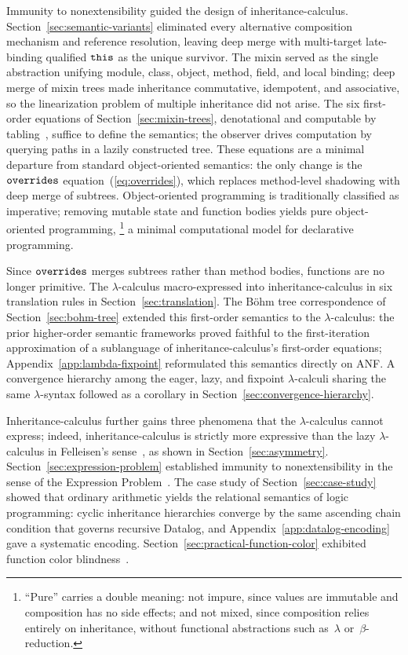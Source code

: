 Immunity to nonextensibility guided the design of
inheritance-calculus.
Section~\ref{sec:semantic-variants} eliminated every
alternative composition mechanism and reference resolution,
leaving deep merge with multi-target late-binding qualified
$\mathtt{this}$ as the unique survivor.
The mixin served as the single abstraction unifying module,
class, object, method, field, and local binding;
deep merge of mixin trees made inheritance commutative, idempotent, and associative,
so the linearization problem of multiple inheritance did not arise.
The six first-order equations of Section~\ref{sec:mixin-trees},
denotational and computable by
tabling~\cite{tamaki1986-tabled-resolution}, suffice to
define the semantics; the observer drives computation by
querying paths in a lazily constructed tree.
These equations are a minimal departure from standard
object-oriented semantics: the only change is the $\mathtt{overrides}$ equation~(\ref{eq:overrides}),
which replaces method-level shadowing with deep merge of subtrees.
Object-oriented programming is traditionally classified as
imperative; removing mutable state and function bodies yields
pure object-oriented programming,%
\footnote{
  ``Pure'' carries a double meaning:
  not impure, since values are immutable and composition has no
  side effects; and not mixed, since composition relies entirely on
  inheritance, without functional abstractions such
  as~$\lambda$ or~$\beta$-reduction.
}
a minimal computational model for declarative programming.

Since $\mathtt{overrides}$ merges subtrees rather than method bodies,
functions are no longer primitive.
The $\lambda$-calculus macro-expressed into
inheritance-calculus in six translation rules in
Section~\ref{sec:translation}.
The B\"ohm tree correspondence of
Section~\ref{sec:bohm-tree} extended this first-order
semantics to the $\lambda$-calculus:
the prior higher-order semantic frameworks proved faithful
to the first-iteration approximation of a sublanguage of
inheritance-calculus's first-order equations;
Appendix~\ref{app:lambda-fixpoint} reformulated this
semantics directly on ANF\@.
A convergence hierarchy among the eager, lazy, and fixpoint
$\lambda$-calculi sharing the same $\lambda$-syntax followed
as a corollary in Section~\ref{sec:convergence-hierarchy}.

Inheritance-calculus further gains three phenomena
that the $\lambda$-calculus cannot express;
indeed, inheritance-calculus is strictly more expressive
than the lazy $\lambda$-calculus in Felleisen's
sense~\cite{felleisen1991-expressive-power},
as shown in Section~\ref{sec:asymmetry}.
Section~\ref{sec:expression-problem} established immunity
to nonextensibility in the sense of the
Expression Problem~\cite{wadler1998-expression-problem}.
The case study of Section~\ref{sec:case-study} showed that
ordinary arithmetic yields the relational semantics of logic
programming: cyclic inheritance hierarchies converge by
the same ascending chain condition that governs recursive
Datalog, and Appendix~\ref{app:datalog-encoding} gave a
systematic encoding.
Section~\ref{sec:practical-function-color} exhibited
function color
blindness~\cite{nystrom2015-function-color}.

